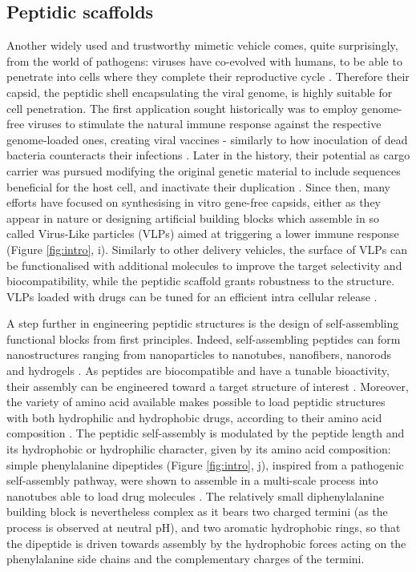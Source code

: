 \subsection{Peptidic scaffolds} Another widely used and trustworthy mimetic vehicle comes, quite surprisingly, from the world of pathogens: viruses have co-evolved with humans, to be able to penetrate into cells where they complete their reproductive cycle \citep{Lobo2009}. Therefore their capsid, the peptidic shell encapsulating the viral genome, is highly suitable for cell penetration. The first application sought historically was to employ genome-free viruses to stimulate the natural immune response against the respective genome-loaded ones, creating viral vaccines - similarly to how inoculation of dead bacteria counteracts their infections \citep{Lauer2017}.
Later in the history, their potential as cargo carrier was pursued modifying the original genetic material to include sequences beneficial for the host cell, and inactivate their duplication \citep{Daya2008}.
%
Since then, many efforts have focused on synthesising in vitro gene-free capsids, either as they appear in nature \citep{Wu2009} or designing artificial building blocks which assemble in so called Virus-Like particles (VLPs) aimed at triggering a lower immune response (Figure \ref{fig:intro}, i).
%
Similarly to other delivery vehicles, the surface of VLPs can be functionalised with additional molecules to improve the target selectivity and biocompatibility, while the peptidic scaffold grants robustness to the structure. VLPs loaded with drugs can be tuned for an efficient intra cellular release \citep{Ma2012}.

A step further in engineering peptidic structures is the design of self-assembling functional blocks from first principles. Indeed, self-assembling peptides can form nanostructures ranging from nanoparticles to nanotubes, nanofibers, nanorods and hydrogels \citep{Fan2017}.
%
As peptides are biocompatible and have a tunable bioactivity, their assembly can be engineered toward a target structure of interest \citep{Fan2017}. Moreover, the variety of amino acid available makes possible to load peptidic structures with both hydrophilic and hydrophobic drugs, according to their amino acid composition \citep{Ma2012}.
%
The peptidic self-assembly is modulated by the peptide length and its hydrophobic or hydrophilic character, given by its amino acid composition: simple phenylalanine dipeptides (Figure \ref{fig:intro}, j), inspired from a pathogenic self-assembly pathway, were shown to assemble in a multi-scale process into nanotubes able to load drug molecules \citep{Silva2013}. The relatively small diphenylalanine building block is nevertheless complex as it bears two charged termini (as the process is observed at neutral pH), and two aromatic hydrophobic rings, so that the dipeptide is driven towards assembly by the hydrophobic forces acting on the phenylalanine side chains and the complementary charges of the termini.

